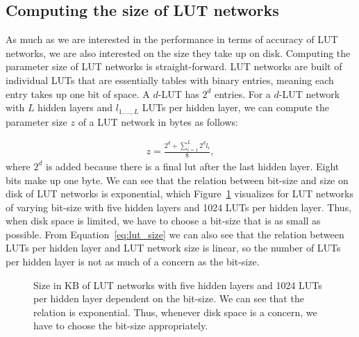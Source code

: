 \subsection{Computing the size of LUT networks} \label{sec:lut_network_size}
As much as we are interested in the performance in terms of accuracy of LUT networks, we are also interested on the size they take up on disk. Computing the parameter size of LUT networks is straight-forward. LUT networks are built of individual LUTs that are essentially tables with binary entries, meaning each entry takes up one bit of space. A $d$-LUT has $2^d$ entries. For a $d$-LUT network with $L$ hidden layers and $l_{1, \dots, L}$ LUTs per hidden layer, we can compute the parameter size $z$ of a LUT network in bytes as follows:

\begin{align} \label{eq:lut_size}
  z = \frac{2^d + \sum\limits_{i=1}^L 2^d l_i}{8},
\end{align}where $2^d$ is added because there is a final lut after the last hidden layer. Eight bits make up one byte. We can see that the relation between bit-size and size on disk of LUT networks is exponential, which Figure~\ref{fig:lut_size} visualizes for LUT networks of varying bit-size with five hidden layers and 1024 LUTs per hidden layer. Thus, when disk space is limited, we have to choose a bit-size that is as small as possible. From Equation~\ref{eq:lut_size} we can also see that the relation between LUTs per hidden layer and LUT network size is linear, so the number of LUTs per hidden layer is not as much of a concern as the bit-size.

\begin{figure}[!htb]
  \centering
  
  \caption{Size in KB of LUT networks with five hidden layers and 1024 LUTs per hidden layer dependent on the bit-size. We can see that the relation is exponential. Thus, whenever disk space is a concern, we have to choose the bit-size appropriately.}
\label{fig:lut_size}
\end{figure}
\FloatBarrier

